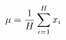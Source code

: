 \documentclass[preview]{standalone}
\begin{document}
\begin{align*}
\special{dvisvgm:raw <g id='unique000'>}\mu = \frac{1}{H} \sum_{i=1}^{H} x_i\special{dvisvgm:raw </g>}
\end{align*}
\end{document}
